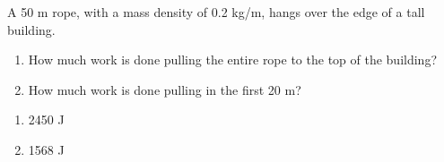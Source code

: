 {A 50 m rope, with a mass density of 0.2 kg/m, hangs over the edge of a tall building.
	\begin{enumerate}
	\item		How much work is done pulling the entire rope to the top of the building?
	\item		How much work is done pulling in the first 20 m?
	\end{enumerate}}
{\begin{enumerate}
	\item 	2450 J
	\item		1568 J
	\end{enumerate}
}
